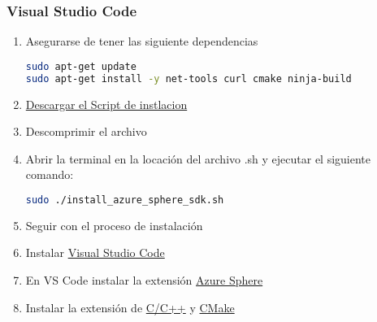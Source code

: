 \subsubsection*{Visual Studio Code}
\begin{enumerate}
	\item 
	Asegurarse de tener las siguiente dependencias
	\begin{lstlisting}[language=bash]
sudo apt-get update
sudo apt-get install -y net-tools curl cmake ninja-build
	\end{lstlisting}

	\item 
	\href{https://aka.ms/AzureSphereSDKInstall/Linux}{Descargar el Script de instlacion}
	\item 
	Descomprimir el archivo
	\item
	Abrir la terminal en la locación del archivo .sh y ejecutar el siguiente comando:
	\begin{lstlisting}[language=bash]
sudo ./install_azure_sphere_sdk.sh
	\end{lstlisting}
	\item 
	Seguir con el proceso de instalación
	\item 
	Instalar \href{https://code.visualstudio.com/download}{Visual Studio Code}
	\item 
	En VS Code instalar la extensión \href{https://marketplace.visualstudio.com/items?itemName=ms-vscode.azure-sphere-tools}{Azure Sphere}
	\item Instalar la extensión de \href{https://marketplace.visualstudio.com/items?itemName=ms-vscode.cpptools}{C/C++} y \href{https://marketplace.visualstudio.com/items?itemName=ms-vscode.cmake-tools}{CMake}
\end{enumerate}